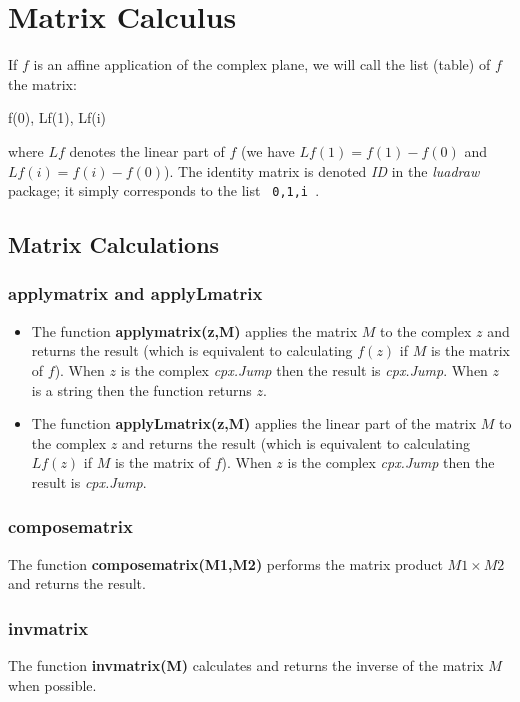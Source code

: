 \section{Matrix Calculus}

If $f$ is an affine application of the complex plane, we will call the list (table) of $f$ the matrix:
\begin{Luacode}
{ f(0), Lf(1), Lf(i) }
\end{Luacode}
where $Lf$ denotes the linear part of $f$ (we have $Lf(1) = f(1)-f(0)$ and $Lf(i) = f(i)-f(0)$). The identity matrix is ​​denoted \emph{ID} in the \emph{luadraw} package; it simply corresponds to the list \texttt{ {0,1,i} }.

\subsection{Matrix Calculations}

\subsubsection{applymatrix and applyLmatrix}
\begin{itemize}
    \item The function \textbf{applymatrix(z,M)} applies the matrix $M$ to the complex $z$ and returns the result (which is equivalent to calculating $f(z)$ if $M$ is the matrix of $f$). When $z$ is the complex \emph{cpx.Jump} then the result is \emph{cpx.Jump}. When $z$ is a string then the function returns $z$.
    \item The function \textbf{applyLmatrix(z,M)} applies the linear part of the matrix $M$ to the complex $z$ and returns the result (which is equivalent to calculating $Lf(z)$ if $M$ is the matrix of $f$). When $z$ is the complex \emph{cpx.Jump} then the result is \emph{cpx.Jump}.
\end{itemize}

\subsubsection{composematrix}
The function \textbf{composematrix(M1,M2)} performs the matrix product $M1\times M2$ and returns the result.

\subsubsection{invmatrix}
The function \textbf{invmatrix(M)} calculates and returns the inverse of the matrix $M$ when possible.

